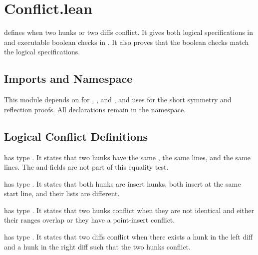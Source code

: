 \section{Conflict.lean}

 defines when two hunks or two diffs conflict. It gives
both logical specifications in  and executable boolean checks in
. It also proves that the boolean checks match the logical
specifications.

\subsection{Imports and Namespace}

This module depends on  for , , and
, and uses  for the short symmetry and
reflection proofs. All declarations remain in the 
namespace.

\subsection{Logical Conflict Definitions}

\begin{definition}[identicalChange]
\code{[identicalChange]} has type . It states that
two hunks have the same , the same  lines, and the
same  lines. The  and  fields are not part of
this equality test.
\end{definition}

\begin{definition}[pointInsertConflict]
\code{[pointInsertConflict]} has type . It states
that both hunks are insert hunks, both insert at the same start line, and their
 lists are different.
\end{definition}

\begin{definition}[hunksConflict]
\code{[hunksConflict]} has type . It states that two
hunks conflict when they are not identical and either their ranges overlap or
they have a point-insert conflict.
\end{definition}

\begin{definition}[diffsConflict]
\code{[diffsConflict]} has type . It states that
two diffs conflict when there exists a hunk in the left diff and a hunk in the
right diff such that the two hunks conflict.
\end{definition}

